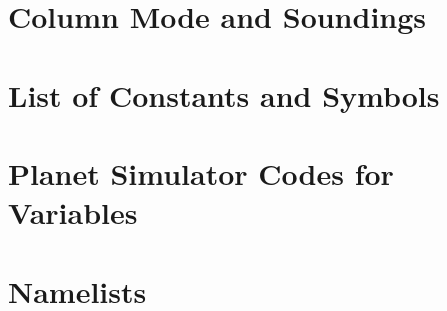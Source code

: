 \documentclass[12pt,twoside,a4paper]{book}
\begin{document}
\chapter{Column Mode and Soundings}
 



\begin{appendix}
\chapter{List of Constants and Symbols}

\chapter{Planet Simulator Codes for Variables}
\label{Pumacodes}

\chapter{Namelists}
\label{Namelist}

\end{appendix}
\end{document}
